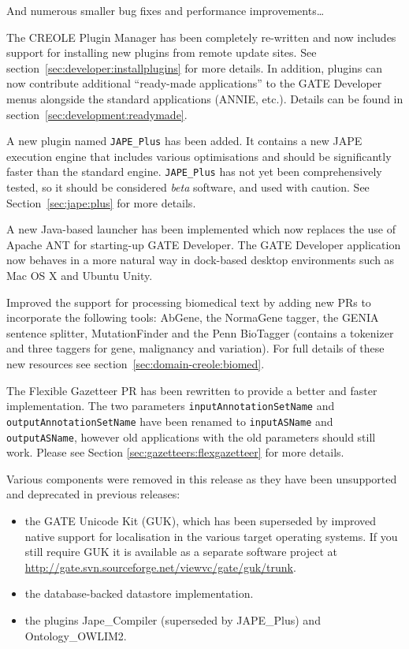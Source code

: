 And numerous smaller bug fixes and performance improvements\ldots




The CREOLE Plugin Manager has been completely re-written and now includes
support for installing new plugins from remote update sites. See
section~\ref{sec:developer:installplugins} for more details.  In addition,
plugins can now contribute additional ``ready-made applications'' to the GATE
Developer menus alongside the standard applications (ANNIE, etc.).  Details can
be found in section~\ref{sec:development:readymade}.

A new plugin named \texttt{JAPE\_Plus} has been added. It contains a new JAPE
execution engine that includes various optimisations and should be significantly
faster than the standard engine. \texttt{JAPE\_Plus} has not yet been
comprehensively tested, so it should be considered {\em beta} software, and used
with caution. See Section~\ref{sec:jape:plus} for more details.

A new Java-based launcher has been implemented which now replaces the use of
Apache ANT for starting-up GATE Developer.  The GATE Developer application now
behaves in a more natural way in dock-based desktop environments such as Mac OS
X and Ubuntu Unity.

Improved the support for processing biomedical text by adding new PRs to
incorporate the following tools: AbGene, the NormaGene tagger, the GENIA
sentence splitter, MutationFinder and the Penn BioTagger (contains a tokenizer
and three taggers for gene, malignancy and variation). For full details of
these new resources see section~\ref{sec:domain-creole:biomed}.

The Flexible Gazetteer PR has been rewritten to provide a better and faster
implementation.  The two parameters \texttt{inputAnnotationSetName} and
\texttt{outputAnnotationSetName} have been renamed to \texttt{inputASName} and
\texttt{outputASName}, however old applications with the old parameters
should still work.  Please see Section \ref{sec:gazetteers:flexgazetteer} for
more details.


Various components were removed in this release as they have been unsupported
and deprecated in previous releases:
\begin{itemize}
\item the GATE Unicode Kit (GUK), which has been superseded by improved native
  support for localisation in the various target operating systems.  If you
  still require GUK it is available as a separate software project at
  \url{http://gate.svn.sourceforge.net/viewvc/gate/guk/trunk}.
\item the database-backed datastore implementation.
\item the plugins Jape\_Compiler (superseded by JAPE\_Plus) and
  Ontology\_OWLIM2.
\end{itemize}

